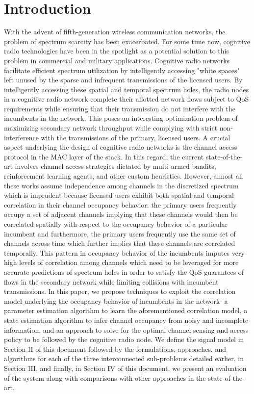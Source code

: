 \documentclass[10pt,twocolumn]{IEEEtran}
\newcommand{\bk}[1]{{\color{magenta}{[BK: #1]}}}
\begin{document}
\section{Introduction}
With the advent of fifth-generation wireless communication networks, the problem of spectrum scarcity has been exacerbated. For some time now, cognitive radio technologies have been in the spotlight as a potential solution to this problem in commercial and military applications. Cognitive radio networks facilitate efficient spectrum utilization by intelligently accessing "white spaces" left unused by the sparse and infrequent transmissions of the licensed users. By intelligently accessing these spatial and temporal spectrum holes, the radio nodes in a cognitive radio network complete their allotted network flows subject to QoS requirements while ensuring that their transmission do not interfere with the incumbents in the network. This poses an interesting optimization problem of maximizing secondary network throughput while complying with strict non-interference with the transmissions of the primary, licensed users. A crucial aspect underlying the design of cognitive radio networks is the channel access protocol in the MAC layer of the stack. In this regard, the current state-of-the-art involves channel access strategies dictated by multi-armed bandits, reinforcement learning agents, and other custom heuristics. However, almost all these works assume independence among channels in the discretized spectrum which is imprudent because licensed users exhibit both spatial and temporal correlation in their channel occupancy behavior: the primary users frequently occupy a set of adjacent channels implying that these channels would then be correlated spatially with respect to the occupancy behavior of a particular incumbent and furthermore, the primary users frequently use the same set of channels across time which further implies that these channels are correlated temporally. This pattern in occupancy behavior of the incumbents imputes very high levels of correlation among channels which need to be leveraged for more accurate predictions of spectrum holes in order to satisfy the QoS guarantees of flows in the secondary network while limiting collisions with incumbent transmissions. In this paper, we propose techniques to exploit the correlation model underlying the occupancy behavior of incumbents in the network- a parameter estimation algorithm to learn the aforementioned correlation model, a state estimation algorithm to infer channel occupancy from noisy and incomplete information, and an approach to solve for the optimal channel sensing and access policy to be followed by the cognitive radio node. We define the signal model in Section II of this document followed by the formulations, approaches, and algorithms for each of the three interconnected sub-problems detailed earlier, in Section III, and finally, in Section IV of this document, we present an evaluation of the system along with comparisons with other approaches in the state-of-the-art.
\\\bk{Include a brief description of the approaches in a few papers in the state-of-the-art: the correlation coefficient based paper, restless MABs, and SARSA}
\end{document}
